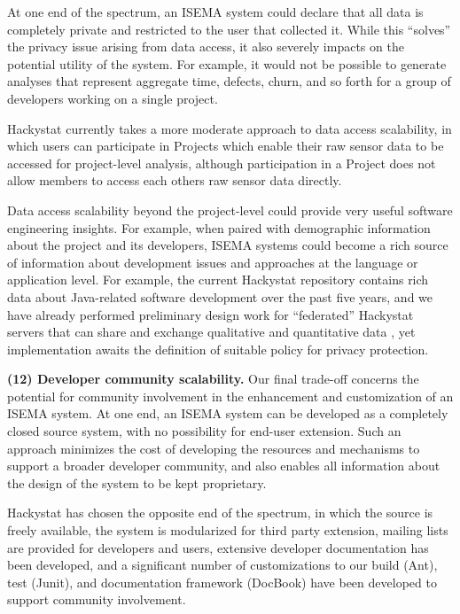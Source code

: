 \documentclass[10pt,twocolumn]{article}
\begin{document}
At one end of the spectrum, an ISEMA system could declare that all data is
completely private and restricted to the user that collected it.  While
this ``solves'' the privacy issue arising from data access, it also
severely impacts on the potential utility of the system. For example, it
would not be possible to generate analyses that represent aggregate time,
defects, churn, and so forth for a group of developers working on a single
project.

Hackystat currently takes a more moderate approach to data access
scalability, in which users can participate in Projects which enable their
raw sensor data to be accessed for project-level analysis, although
participation in a Project does not allow members to access each others raw
sensor data directly.

Data access scalability beyond the project-level could provide very useful 
software engineering insights. For example, when paired with demographic information
about the project and its developers, ISEMA systems could become a rich source 
of information about development issues and approaches at the language or
application level.  For example, the current Hackystat repository contains rich 
data about Java-related software development over the past five years, and we 
have already performed preliminary design work for ``federated'' Hackystat servers 
that can share and exchange qualitative and quantitative data \cite{csdl2-05-02}, 
yet implementation awaits the definition of suitable policy for privacy protection. 


{\bf (12) Developer community scalability.} Our final trade-off concerns
the potential for community involvement in the enhancement and
customization of an ISEMA system.  At one end, an ISEMA system can be
developed as a completely closed source system, with no possibility for
end-user extension.  Such an approach minimizes the cost of developing the
resources and mechanisms to support a broader developer community, and also
enables all information about the design of the system to be kept
proprietary.

Hackystat has chosen the opposite end of the spectrum, in which the source
is freely available, the system is modularized for third party extension,
mailing lists are provided for developers and users, extensive developer
documentation has been developed, and a significant number of
customizations to our build (Ant), test (Junit), and documentation
framework (DocBook) have been developed to support community involvement.
\end{document}
